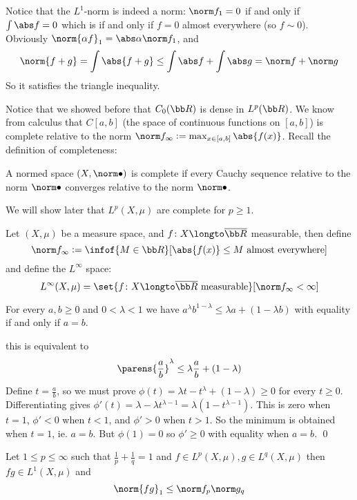 Notice that the $L^1$-norm is indeed a norm: $\norm f_1=0$ if and only if $\int \abs f=0$ which is if and only if $f=0$ almost everywhere (so $f\sim0$).
Obviously $\norm{\alpha f}_1=\abs\alpha\norm f_1$, and
$$ \norm{f+g} = \int\abs{f+g} \leq \int\abs f + \int\abs g = \norm f + \norm g $$
So it satisfies the triangle inequality.

Notice that we showed before that $C_0({\bb R})$ is dense in $L^p({\bb R})$.
We know from calculus that $C[a,b]$ (the space of continuous functions on $[a,b]$) is complete relative to the norm $\norm f_\infty\coloneqq\max_{x\in[a,b]}\abs{f(x)}$.
Recall the definition of completeness:

\bdefn

    A normed space $(X,\norm\bullet)$ is {\emphcolor complete} if every Cauchy sequence relative to the norm $\norm\bullet$ converges relative to the norm $\norm\bullet$.

\edefn

We will show later that $L^p(X,\mu)$ are complete for $p\geq1$.

\bdefn

    Let $(X,\mu)$ be a measure space, and $f\colon X\longto\overline{\bb R}$ measurable, then define
    $$ \norm f_\infty \coloneqq \infof{M\in{\bb R}}[\abs{f(x)}\leq M\hbox{ almost everywhere}] $$
    and define the $L^\infty$ space:
    $$ L^\infty(X,\mu) = \set{f\colon X\longto\overline{\bb R}\hbox{ measurable}}[\norm f_\infty<\infty] $$

\edefn

\blemm

    For every $a,b\geq0$ and $0<\lambda<1$ we have $a^\lambda b^{1-\lambda}\leq\lambda a+(1-\lambda b)$ with equality if and only if $a=b$.

\elemm

\Proof this is equivalent to
$$ \parens{\frac ab}^\lambda \leq \lambda\frac ab + (1-\lambda) $$
Define $t=\frac ab$, so we must prove $\phi(t)=\lambda t-t^\lambda+(1-\lambda)\geq0$ for every $t\geq0$.
Differentiating gives $\phi'(t)=\lambda-\lambda t^{\lambda-1}=\lambda(1-t^{\lambda-1})$.
This is zero when $t=1$, $\phi'<0$ when $t<1$, and $\phi'>0$ when $t>1$.
So the minimum is obtained when $t=1$, ie. $a=b$.
But $\phi(1)=0$ so $\phi'\geq0$ with equality when $a=b$.
\qed

\bthrm[title=H\"older's Inequality, name=holder]

    Let $1\leq p\leq\infty$ such that $\frac1p+\frac1q=1$ and $f\in L^p(X,\mu),g\in L^q(X,\mu)$ then $fg\in L^1(X,\mu)$ and
    $$ \norm{fg}_1 \leq \norm f_p\norm g_q $$

